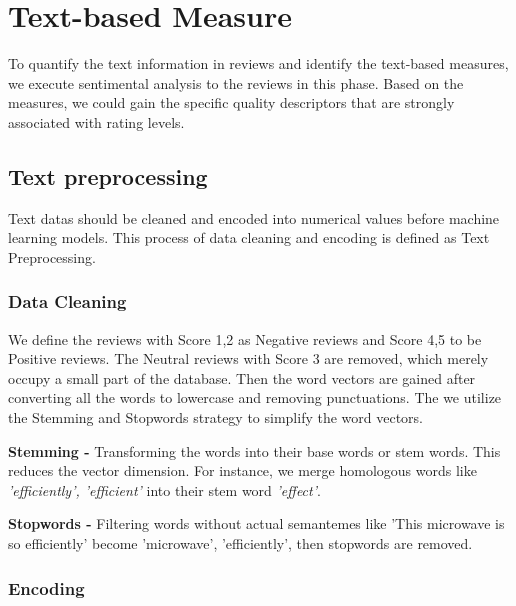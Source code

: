 \documentclass[12pt]{article}%
\begin{document}
\section{Text-based Measure }
To quantify the text information in reviews and identify the text-based measures, we execute sentimental analysis to the reviews in this phase. Based on the measures, we could gain the specific quality descriptors that are strongly associated with rating levels.
\subsection{Text preprocessing}
Text datas should be cleaned and encoded into numerical values before machine learning models. This process of data cleaning and encoding is defined as Text Preprocessing.

\subsubsection{Data Cleaning}
	We define the reviews with Score 1,2 as Negative reviews and Score 4,5 to be Positive reviews. The Neutral reviews with Score 3 are removed, which merely occupy a small part of the database. Then the word vectors\cite{BOW} are gained after converting all the words to lowercase and removing punctuations. The we utilize the Stemming and Stopwords strategy to simplify the word vectors.
	



	\textbf{Stemming -} Transforming the words into their base words or stem words. This reduces the vector dimension. For instance, we merge homologous words like \textit{'efficiently', 'efficient'}  into their stem word \textit{'effect'}.
	
	\textbf{Stopwords -} Filtering words without actual semantemes like 'This microwave is so efficiently' become 'microwave', 'efficiently', then stopwords are removed.


\subsubsection{Encoding}
	
\end{document}

